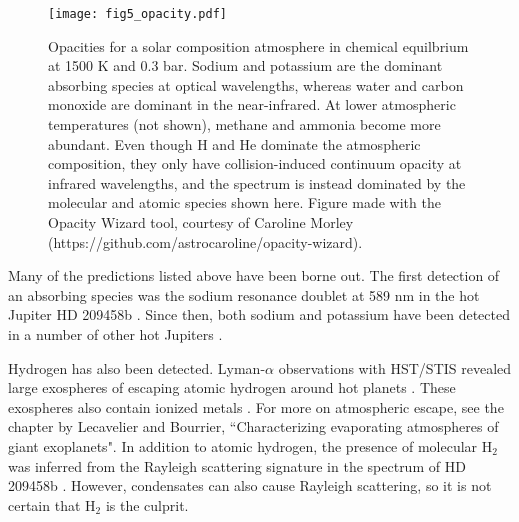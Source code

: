 \documentclass[graybox,natbib,nosecnum]{svmult}
\newcommand{\hbindex}[1]{\hl{#1}\index{#1}}  %
\begin{document}
\begin{figure}
\begin{centering}
\texttt{[image: fig5\_opacity.pdf]}
\caption{Opacities for a solar composition atmosphere in chemical equilbrium at 1500 K and 0.3 bar. Sodium and potassium are the dominant absorbing species at optical wavelengths, whereas water and carbon monoxide are dominant in the near-infrared. At lower atmospheric temperatures (not shown), methane and ammonia become more abundant.  Even though H and He dominate the atmospheric composition, they only have collision-induced continuum opacity at infrared wavelengths, and the spectrum is instead dominated by the molecular and atomic species shown here.  Figure made with the Opacity Wizard tool, courtesy of Caroline Morley (https://github.com/astrocaroline/opacity-wizard).}
\label{fig:opacity}       
\end{centering}
\end{figure}


Many of the predictions listed above have been borne out.  The first detection of an absorbing species was the sodium resonance doublet at 589 nm in the hot Jupiter HD 209458b \citep{charbonneau02}. Since then, both sodium and potassium have been detected in a number of other hot Jupiters \citep[e.g.][]{sing11b, nikolov14}. 

Hydrogen has also been detected.  Lyman-$\alpha$ observations with HST/STIS revealed large exospheres of escaping atomic hydrogen around hot planets \citep[e.g.][]{vidal-madjar03, ehrenreich15}.  These exospheres also contain ionized metals \citep[e.g., OI, CII;][]{vidal-madjar04}. For more on atmospheric escape, see the chapter by Lecavelier and Bourrier, ``Characterizing evaporating atmospheres of giant exoplanets". In addition to atomic hydrogen, the presence of molecular H$_2$ was inferred from the Rayleigh scattering signature in the spectrum of HD 209458b \citep{lecavelier08}. However, condensates can also cause Rayleigh scattering, so it is not certain that H$_2$ is the culprit. 
\end{document}
